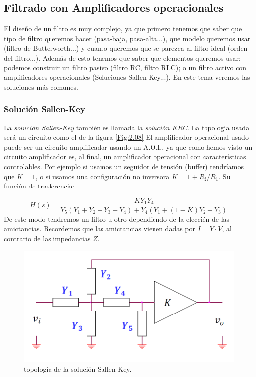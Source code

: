 \documentclass[11pt]{article} %
\begin{document}
\subsection{Filtrado con Amplificadores operacionales}

El diseño de un filtro es muy complejo, ya que primero tenemos que saber que tipo de filtro queremos hacer (pasa-baja, pasa-alta...), que modelo queremos usar (filtro de Butterworth...) y cuanto queremos que se parezca al filtro ideal (orden del filtro...). Además de esto tenemos que saber que elementos queremos usar: podemos construir un filtro pasivo (filtro RC, filtro RLC); o un filtro activo con amplificadores operacionales (Soluciones Sallen-Key...). En este tema veremos las soluciones más comunes. \\

\subsubsection{Solución Sallen-Key}

La \textit{solución Sallen-Key} también es llamada la \textit{solución KRC}. La topología usada será un circuito como el de la figura \ref{Fig:2.08} El amplificador operacional usado puede ser un circuito amplificador usando un A.O.I., ya que como hemos visto un circuito amplificador es, al final, un amplificador operacional con características controlables. Por ejemplo si usamos un seguidor de tensión (buffer) tendríamos que $K=1$, o si usamos una configuración no inversora $K=1+R_2/R_1$. Su función de trasferencia:

\begin{equation}
H(s) = \dfrac{K Y_1 Y_4}{Y_5(Y_1+Y_2+Y_3+Y_4) + Y_4(Y_1+(1-K)Y_2+Y_3)}
\end{equation}
De este modo tendremos un filtro u otro dependiendo de la elección de las amictancias. Recordemos que las amictancias vienen dadas por $I = Y \cdot V$, al contrario de las impedancias $Z$. 

\begin{figure}[h!] \centering
\includegraphics[scale=0.55]{2.4-KRC}
\caption{topología de la solución Sallen-Key.}
\label{Fig:2.19}
\end{figure}
\end{document}
